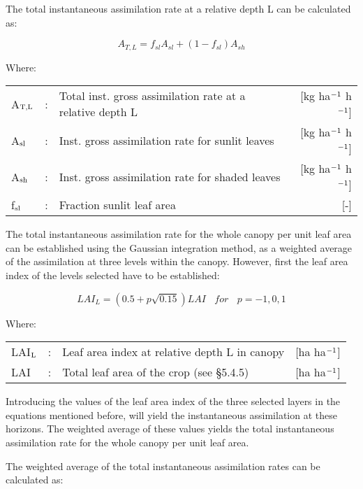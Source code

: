The total instantaneous assimilation rate at a relative depth L can be calculated as:

\begin{equation}
A_{T,L} = f_{sl} A_{sl} + (1 - f_{sl}) A_{sh} 
\end{equation}

Where:\\[5pt]
\begin{tabularx}{\textwidth}{llXr}
A$_{{\rm T,L}}$ &:& Total inst. gross assimilation rate at a relative depth L   &
     [kg ha$^{{\rm -1}}$ h$^{{\rm -1}}$]\\
A$_{{\rm sl}}$ &:& Inst. gross assimilation rate for sunlit leaves  & 
     [kg ha$^{{\rm -1}}$ h$^{{\rm -1}}$]\\
A$_{{\rm sh}}$ &:& Inst. gross assimilation rate for shaded leaves  & 
     [kg ha$^{{\rm -1}}$ h$^{{\rm -1}}$]\\
f$_{{\rm sl}}$ &:& Fraction sunlit leaf area  &  [-]\\
\end{tabularx}

The total instantaneous assimilation rate for the whole canopy per unit leaf area can be
established using the Gaussian integration method, as a weighted average of the assimilation 
at three levels within the canopy.
However, first the leaf area index of the levels selected have to be established:

\begin{equation}
LAI_{L} = (0.5+p \sqrt{0.15})LAI~~~~for~~~~p=-1,0,1
\end{equation}

Where:\\[5pt]
\begin{tabularx}{\textwidth}{llXr}
LAI$_{{\rm L}}$ &:& Leaf area index at relative depth L in canopy    &    [ha ha$^{{\rm -1}}$]\\
LAI &:& Total leaf area of the crop (see \S 5.4.5) &   [ha ha$^{{\rm -1}}$]\\
\end{tabularx}

Introducing the values of the leaf area index of the three selected layers in the equations
mentioned before, will yield the instantaneous assimilation at these horizons. The
weighted average of these values yields the total instantaneous assimilation rate for the
whole canopy per unit leaf area.

The weighted average of the total instantaneous assimilation rates can be calculated as:

